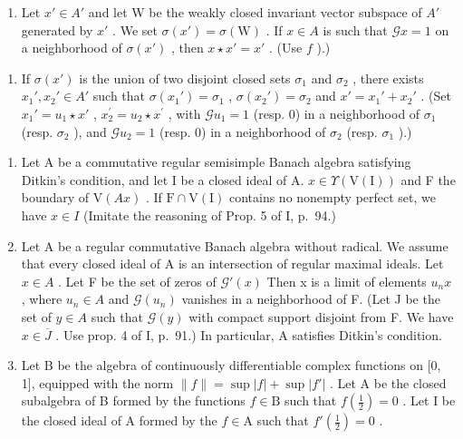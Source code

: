\begin{enumerate}
\def\labelenumi{\alph{enumi})}
\setcounter{enumi}{6}
\tightlist
\item
  Let \(x' \in A'\) and let W be the weakly closed invariant vector subspace of \(A'\) generated by \(x'\) . We set \(\sigma(x') = \sigma(\mathrm{W})\) . If \(x \in A\) is such that \(\mathcal{G}x = 1\) on a neighborhood of \(\sigma(x')\) , then \(x \star x' = x'\) . (Use \(f\) ).)
\end{enumerate}

\begin{enumerate}
\def\labelenumi{\alph{enumi})}
\setcounter{enumi}{7}
\tightlist
\item
  If \(\sigma(x')\) is the union of two disjoint closed sets \(\sigma_1\) and \(\sigma_2\) , there exists \(x_1', x_2' \in A'\) such that \(\sigma(x_1') = \sigma_1\) , \(\sigma(x_2') = \sigma_2\) and \(x' = x_1' + x_2'\) . (Set \(x_1' = u_1 \star x'\) , \(x_{2}^{\prime}=u_{2}\star x^{\prime}\) , with \(\mathcal{G}u_{1}=1\) (resp. 0) in a neighborhood of \(\sigma_{1}\) (resp. \(\sigma_{2}\) ), and \(\mathcal{G}u_{2}=1\) (resp. 0) in a neighborhood of \(\sigma_{2}\) (resp. \(\sigma_{1}\) ).)
\end{enumerate}

\begin{enumerate}
\def\labelenumi{\arabic{enumi})}
\setcounter{enumi}{3}
\item
  Let A be a commutative regular semisimple Banach algebra satisfying Ditkin's condition, and let I be a closed ideal of A. \(x \in \Upsilon(\mathrm{V}(\mathrm{I}))\) and F the boundary of \(\mathrm{V}(Ax)\) . If \(\mathrm{F} \cap \mathrm{V}(\mathrm{I})\) contains no nonempty perfect set, we have \(x \in I\) (Imitate the reasoning of Prop. 5 of I, p.~94.)
\item
  Let A be a regular commutative Banach algebra without radical. We assume that every closed ideal of A is an intersection of regular maximal ideals. Let \(x \in A\) . Let F be the set of zeros of \(\mathcal{G}'(x)\) Then x is a limit of elements \(u_{n}x\) , where \(u_{n} \in A\) and \(\mathcal{G}(u_{n})\) vanishes in a neighborhood of F. (Let J be the set of \(y \in A\) such that \(\mathcal{G}(y)\) with compact support disjoint from F. We have \(x \in \overline{J}\) . Use prop. 4 of I, p.~91.) In particular, A satisfies Ditkin's condition.
\item
  Let B be the algebra of continuously differentiable complex functions on {[}0, 1{]}, equipped with the norm \(\|f\| = \sup |f| + \sup |f'|\) . Let A be the closed subalgebra of B formed by the functions \(f \in \mathrm{B}\) such that \(f\left(\frac{1}{2}\right) = 0\) . Let I be the closed ideal of A formed by the \(f \in \mathrm{A}\) such that \(f'\left(\frac{1}{2}\right) = 0\) .
\end{enumerate}

